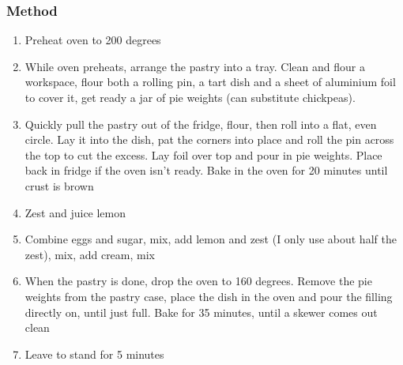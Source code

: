 \documentclass[]{article}
\begin{document}
\subsubsection*{\Large Method}
\begin{enumerate}[font=\huge\color{accent}]
	\item Preheat oven to 200 degrees
	\item While oven preheats, arrange the pastry into a tray. Clean and flour a workspace, flour both a rolling pin, a tart dish and a sheet of aluminium foil to cover it, get ready a jar of pie weights (can substitute chickpeas).
	\item Quickly pull the pastry out of the fridge, flour, then roll into a flat, even circle. Lay it into the dish, pat the corners into place and roll the pin across the top to cut the excess. Lay foil over top and pour in pie weights.  Place back in fridge if the oven isn’t ready. Bake in the oven for 20 minutes until crust is brown
	\item Zest and juice lemon
	\item Combine eggs and sugar, mix, add lemon and zest (I only use about half the zest), mix, add cream, mix
	\item When the pastry is done, drop the oven to 160 degrees. Remove the pie weights from the pastry case, place the dish in the oven and pour the filling directly on, until just full. Bake for 35 minutes, until a skewer comes out clean
	\item Leave to stand for 5 minutes
\end{enumerate}
\newpage
{}\label{rec:Strawberry Flan}
\end{document}
